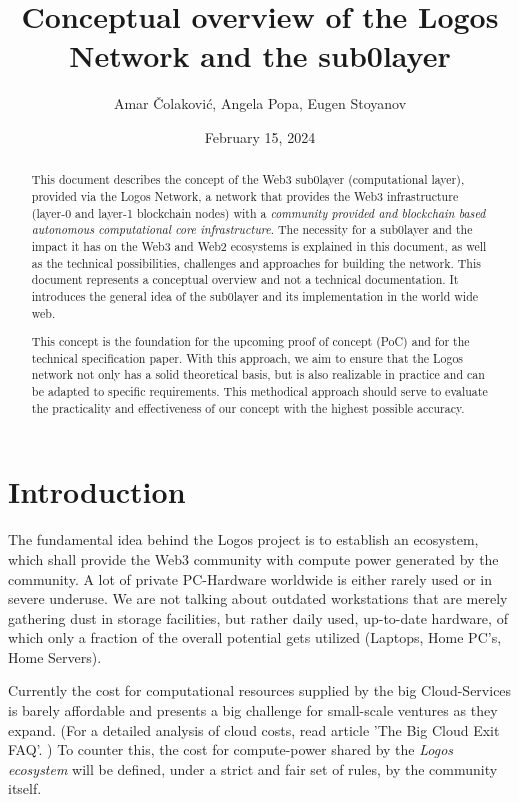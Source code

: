 \documentclass[]{article}
\title{Conceptual overview of the Logos Network and the sub0layer}
\author{Amar Čolaković, Angela Popa, Eugen Stoyanov}
\affil{LogosLabs}
\date{February 15, 2024}
\begin{document}
\maketitle

\begin{abstract}
This document describes the concept of the {Web3 sub0layer} (computational layer), provided via the Logos Network, a network that provides the Web3 infrastructure (layer-0 and layer-1 blockchain nodes) with a \textit{community provided and blockchain based autonomous computational core infrastructure}.
The necessity for a sub0layer and the impact it has on the Web3 and Web2 ecosystems is explained in this document, as well as the technical possibilities, challenges and approaches for building the network.   
This document represents a conceptual overview and not a technical documentation. It introduces the general idea of the sub0layer and its implementation in the world wide web.

This concept is the foundation for the upcoming proof of concept (PoC) and for the technical specification paper. 
With this approach, we aim to ensure that the Logos network not only has a solid theoretical basis, but is also realizable in practice and can be adapted to specific requirements.
This methodical approach should serve to evaluate the practicality and effectiveness of our concept with the highest possible accuracy.    
\end{abstract}

\tableofcontents
\newpage

\section{Introduction}
The fundamental idea behind the Logos project is to establish an ecosystem, which shall provide the Web3 community with compute power generated by the community.
A lot of private PC-Hardware worldwide is either rarely used or in severe underuse. 
We are not talking about outdated workstations that are merely gathering dust in storage facilities, but rather daily used, up-to-date hardware, of which only a fraction of the overall potential gets utilized (Laptops, Home PC’s, Home Servers).

Currently the cost for computational resources supplied by the big Cloud-Services is barely affordable and presents a big challenge for small-scale ventures as they expand. (For a detailed analysis of cloud costs, read article 'The Big Cloud Exit FAQ'. \cite{david-hainemeier-hansson})
To counter this, the cost for compute-power shared by the \textit{Logos ecosystem} will be defined, under a strict and fair set of rules, by the community itself.
\end{document}
